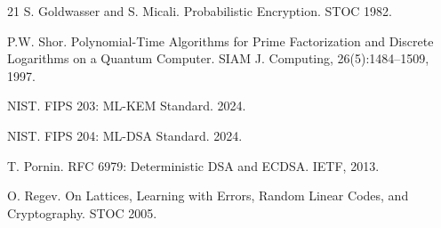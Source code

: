 \documentclass[11pt,a4paper]{article}
\begin{document}
\begin{thebibliography}{21}
 S. Goldwasser and S. Micali. Probabilistic Encryption. STOC 1982.

 P.W. Shor. Polynomial-Time Algorithms for Prime Factorization and Discrete Logarithms on a Quantum Computer. SIAM J. Computing, 26(5):1484–1509, 1997.

 NIST. FIPS 203: ML-KEM Standard. 2024.

 NIST. FIPS 204: ML-DSA Standard. 2024.

 T. Pornin. RFC 6979: Deterministic DSA and ECDSA. IETF, 2013.

 O. Regev. On Lattices, Learning with Errors, Random Linear Codes, and Cryptography. STOC 2005.

\end{thebibliography}
\end{document}
